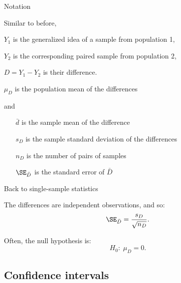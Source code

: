 \begin{frame}{Notation}

  Similar to before,
  \begin{itemizew}{.5em}
    \item[$Y_1$] is the generalized idea of a sample from population 1,
    \item[$Y_2$] is the \alert{corresponding paired} sample from population 2,
    \item[$D=Y_1-Y_2$] is their difference.
    \item[$\mu_D$] is the population mean of the differences
  \end{itemizew}
  and
  \begin{itemize}
    \item[$\bar d$] is the sample mean of the difference 
    \item[$s_D$] is the sample standard deviation of the differences
    \item[$n_D$] is the number of pairs of samples
    \item[$\SE_{\bar D}$] is the standard error of $\bar D$
  \end{itemize}

    \vspace{2em}

\end{frame}

\begin{frame}{Back to single-sample statistics}

    The differences are independent observations, and so:
    \begin{align*}
      \SE_{\bar D} = \frac{s_D}{\sqrt{n_D}} .
    \end{align*}

    \vspace{2em}

    Often, the null hypothesis is:
    \[ H_0: \; \mu_D = 0 .\]

\end{frame}

\subsection{Confidence intervals}

